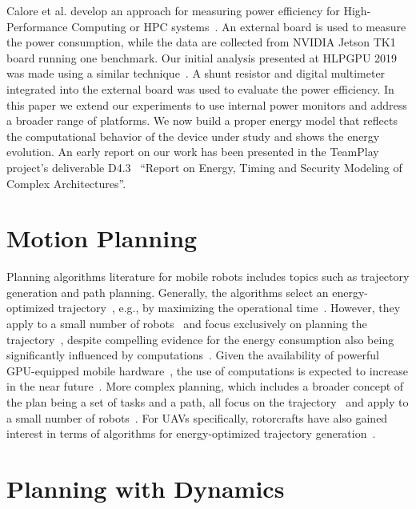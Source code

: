 Calore et al. develop an approach for measuring power efficiency for High-Performance Computing or HPC systems~\citep{calore2015energy}. An external board is used to measure the power consumption, while the data are collected from NVIDIA Jetson TK1 board running one benchmark. Our initial analysis presented at HLPGPU 2019 was made using a similar technique~\citep{seewald2019hlpgpu}. A shunt resistor and digital multimeter integrated into the external board was used to evaluate the power efficiency. In this paper we extend our experiments to use internal power monitors and address a broader range of platforms. We now build a proper energy model that reflects the computational behavior of the device under study and shows the energy evolution. An early report on our work has been presented in the TeamPlay project's deliverable D4.3~\citep{teamplay} ``Report on Energy, Timing and Security Modeling of Complex Architectures''.


\section{\color{cyan}Motion Planning}
\label{sec:soa-motion-pl}

Planning algorithms literature for mobile robots includes topics such as trajectory generation and path planning. Generally, the algorithms select an energy-optimized trajectory~\cite{mei2004energy}, e.g., by maximizing the operational time~\cite{wahab2015energy}. However, they apply to a small number of robots~\cite{kim2005energy} and focus exclusively on planning the trajectory~\cite{kim2008minimum}, despite compelling evidence for the energy consumption also being significantly influenced by computations~\cite{mei2005case}. Given the availability of powerful GPU-equipped mobile hardware~\cite{rizvi2017general}, the use of computations is expected to increase in the near future~\cite{abramov2012real,satria2016real,jaramillo2019visual}. More complex planning, which includes a broader concept of the plan being a set of tasks and a path, all focus on the trajectory~\cite{mei2005case,mei2006deployment} and apply to a small number of robots~\cite{sadrpour2013mission,sadrpour2013experimental}. For UAVs specifically, rotorcrafts have also gained interest in terms of algorithms for energy-optimized trajectory generation~\cite{morbidi2016minimum,kreciglowa2017energy}. 


\section{\color{red}Planning with Dynamics}
\label{sec:soa-dynamics-pl}

